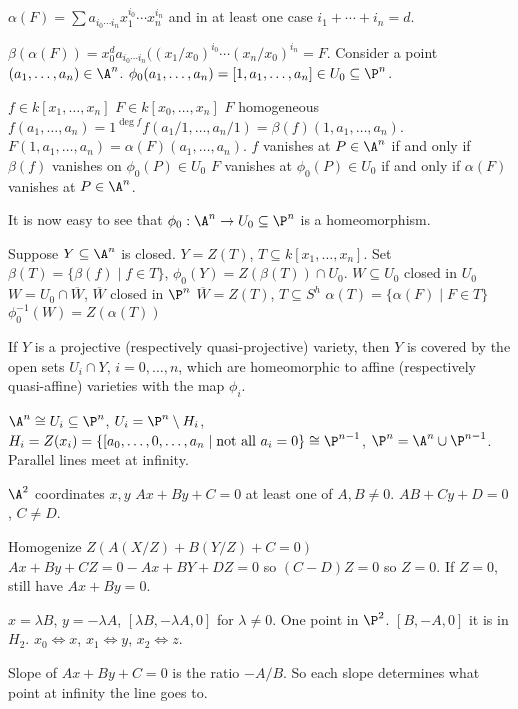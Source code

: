 $\alpha(F)= \sum a_{i_0 \cdots i_n} x_1^{i_0} \cdots x_n^{i_n}$ and in at least one case $i_1+ \cdots + i_n = d$. 

$\beta(\alpha(F))= x_0^d a_{i_0 \cdots i_n} ((x_1/x_0)^{i_0} \cdots (x_n/x_0)^{i_n}= F$. Consider a point $(a_1,\ldots,a_n) \in \A^n$. $\phi_0(a_1,\ldots,a_n)= [1,a_1,\ldots,a_n] \in U_0 \subseteq \P^n$. 

$f \in k[x_1,\ldots,x_n]$
$F \in k[x_0,\ldots,x_n]$ $F$ homogeneous
$f(a_1,\ldots,a_n)= 1^{\deg f} f(a_1/1,\ldots,a_n/1)= \beta(f)(1,a_1,\ldots,a_n)$.
$F(1,a_1,\ldots,a_n)= \alpha(F)(a_1,\ldots,a_n)$.
$f$ vanishes at $P \in \A^n$ if and only if $\beta(f)$ vanishes on $\phi_0(P) \in U_0$
$F$ vanishes at $\phi_0(P) \in U_0$ if and only if $\alpha(F)$ vanishes at $P \in \A^n$.

It is now easy to see that $\phi_0: \A^n \to U_0 \subseteq \P^n$ is a homeomorphism. 

Suppose $Y \subseteq \A^n$ is closed. $Y= Z(T)$, $T \subseteq k[x_1,\ldots,x_n]$. Set $\beta(T)= \{ \beta(f) \;|\; f \in T \}$, $\phi_0(Y)= Z(\beta(T)) \cap U_0$. 
$W \subseteq U_0$ closed in $U_0$
$W= U_0 \cap \overline{W}$, $\overline{W}$ closed in $\P^n$
$\overline{W}= Z(T)$, $T \subseteq S^h$
$\alpha(T)= \{ \alpha(F) \;|\; F \in T\}$
$\phi_0^{-1}(W)= Z(\alpha(T))$


\begin{cor}
If $Y$ is a projective (respectively quasi-projective) variety, then $Y$ is covered by the open sets $U_i \cap Y$, $i= 0,\ldots,n$, which are homeomorphic to affine (respectively quasi-affine) varieties with the map $\phi_i$. 
\end{cor}


$\A^n \cong U_i \subseteq \P^n$, $U_i= \P^n \setminus H_i$, $H_i= Z(x_i)= \{ [a_0,\ldots,0,\ldots,a_n \;|\; \text{not all }a_i=0 \} \cong \P^{n-1}$, $\P^n= \A^n \cup \P^{n-1}$. Parallel lines meet at infinity. 



$\A^2$ coordinates $x,y$
$Ax+By+C=0$ at least one of $A,B \neq 0$.
$AB+Cy+D=0$, $C \neq D$.

Homogenize 
$Z(A(X/Z)+B(Y/Z)+C=0)$
$Ax+By+CZ=0-Ax+BY+DZ=0$ so $(C-D)Z=0$ so $Z=0$. 
If $Z=0$, still have $Ax+By= 0$. 

$x= \lambda B$, $y= -\lambda A$, $[\lambda B, -\lambda A,0]$ for $\lambda \neq 0$. One point in $\P^2$. $[B,-A,0]$ it is in $H_2$. $x_0 \iff x$, $x_1 \iff y$, $x_2 \iff z$.

Slope of $Ax+By+C=0$ is the ratio $-A/B$. So each slope determines what point at infinity the line goes to. 


